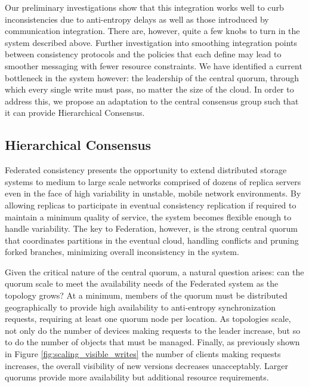 \documentclass{article}
\begin{document}
Our preliminary investigations show that this integration works well to curb inconsistencies due to anti-entropy delays as well as those introduced by communication integration. There are, however, quite a few knobs to turn in the system described above. Further investigation into smoothing integration points between consistency protocols and the policies that each define may lead to smoother messaging with fewer resource constraints. We have identified a current bottleneck in the system however: the leadership of the central quorum, through which every single write must pass, no matter the size of the cloud. In order to address this, we propose an adaptation to the central consensus group such that it can provide Hierarchical Consensus.

\subsection{Hierarchical Consensus}

Federated consistency presents the opportunity to extend distributed storage systems to medium to large scale networks comprised of dozens of replica servers even in the face of high variability in unstable, mobile network environments. By allowing replicas to participate in eventual consistency replication if required to maintain a minimum quality of service, the system becomes flexible enough to handle variability. The key to Federation, however, is the strong central quorum that coordinates partitions in the eventual cloud, handling conflicts and pruning forked branches, minimizing overall inconsistency in the system.

Given the critical nature of the central quorum, a natural question arises: can the quorum scale to meet the availability needs of the Federated system as the topology grows? At a minimum, members of the quorum must be distributed geographically to provide high availability to anti-entropy synchronization requests, requiring at least one quorum node per location. As topologies scale, not only do the number of devices making requests to the leader increase, but so to do the number of objects that must be managed. Finally, as previously shown in Figure \ref{fig:scaling_visible_writes} the number of clients making requests increases, the overall visibility of new versions decreases unacceptably. Larger quorums provide more availability but additional resource requirements.
\end{document}
